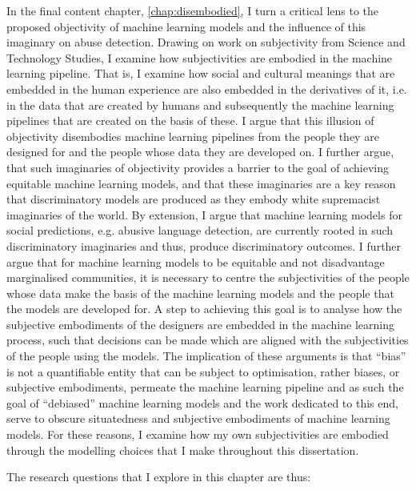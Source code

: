 {In the final content chapter, \cref{chap:disembodied}, I turn a critical lens to the proposed objectivity of machine learning models and the influence of this imaginary on abuse detection.
Drawing on work on subjectivity from Science and Technology Studies, I examine how subjectivities are embodied in the machine learning pipeline.
That is, I examine how social and cultural meanings that are embedded in the human experience are also embedded in the derivatives of it, i.e. in the data that are created by humans and subsequently the machine learning pipelines that are created on the basis of these.
I argue that this illusion of objectivity \citep{Haraway:1988} disembodies machine learning pipelines from the people they are designed for and the people whose data they are developed on.
I further argue, that such imaginaries of objectivity provides a barrier to the goal of achieving equitable machine learning models, and that these imaginaries are a key reason that discriminatory models are produced as they embody white supremacist imaginaries of the world.
By extension, I argue that machine learning models for social predictions, e.g. abusive language detection, are currently rooted in such discriminatory imaginaries and thus, produce discriminatory outcomes.
I further argue that for machine learning models to be equitable and not disadvantage marginalised communities, it is necessary to centre the subjectivities of the people whose data make the basis of the machine learning models and the people that the models are developed for.
A step to achieving this goal is to analyse how the subjective embodiments of the designers are embedded in the machine learning process, such that decisions can be made which are aligned with the subjectivities of the people using the models.
The implication of these arguments is that ``bias'' is not a quantifiable entity that can be subject to optimisation, rather biases, or subjective embodiments, permeate the machine learning pipeline and as such the goal of ``debiased'' machine learning models and the work dedicated to this end, serve to obscure situatedness and subjective embodiments of machine learning models.
For these reasons, I examine how my own subjectivities are embodied through the modelling choices that I make throughout this dissertation.

The research questions that I explore in this chapter are thus:

}
